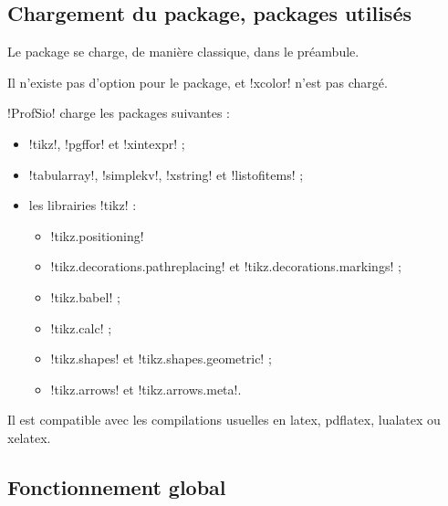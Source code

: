 \documentclass[french,a4paper,11pt]{article}
\begin{document}
{\subsection{Chargement du package, packages utilisés}

\begin{importantblock}
Le package se charge, de manière classique, dans le préambule.

Il n'existe pas d'option pour le package, et \packagetex!xcolor! n'est pas chargé.
\end{importantblock}


\begin{noteblock}
\packagetex!ProfSio! charge les packages suivantes :

\begin{itemize}
	\item \packagetex!tikz!, \packagetex!pgffor! et \packagetex!xintexpr! ;
	\item \packagetex!tabularray!, \packagetex!simplekv!, \packagetex!xstring! et \packagetex!listofitems! ;
	\item les librairies \packagetex!tikz! :
	\begin{itemize}
		\item \motcletex!tikz.positioning!
		\item \motcletex!tikz.decorations.pathreplacing! et \motcletex!tikz.decorations.markings! ;
		\item \motcletex!tikz.babel! ;
		\item \motcletex!tikz.calc! ;
		\item \motcletex!tikz.shapes! et \motcletex!tikz.shapes.geometric! ;
		\item \motcletex!tikz.arrows! et \motcletex!tikz.arrows.meta!.
	\end{itemize}
\end{itemize}

Il est compatible avec les compilations usuelles en \textsf{latex}, \textsf{pdflatex}, \textsf{lualatex} ou \textsf{xelatex}.
\end{noteblock}

\subsection{Fonctionnement global}

}
\end{document}
